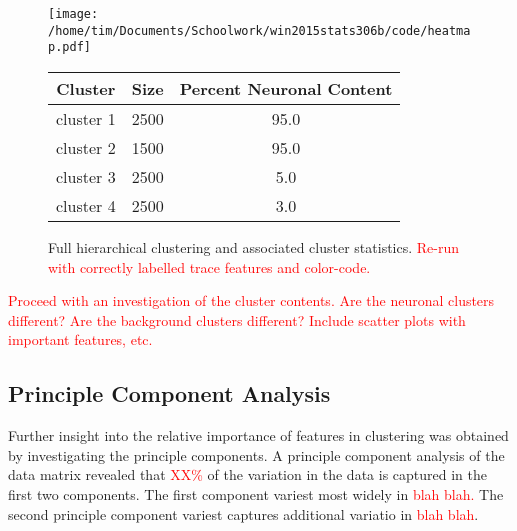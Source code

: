 \documentclass[10pt]{article}
\newcommand{\todo}[1]{\textcolor{red}{#1}}
\begin{document}
\begin{figure}[h]
    \centering

    \begin{minipage}{0.55\textwidth}
      \centering
      \texttt{[image: /home/tim/Documents/Schoolwork/win2015stats306b/code/heatmap.pdf]}
    \end{minipage}
    \begin{minipage}{0.4\textwidth}
      \centering
      \scriptsize
      \begin{tabular}{cSS}
        \toprule
        Cluster & {Size} & {Percent Neuronal Content} \\
        \midrule
        cluster 1 & 2500 & 95.0 \\
        cluster 2 & 1500 & 95.0 \\
        cluster 3 & 2500 &  5.0 \\
        cluster 4 & 2500 &  3.0 \\
        \bottomrule
      \end{tabular}
    \end{minipage}
    \caption{\footnotesize Full hierarchical clustering and associated cluster statistics. \todo{Re-run with correctly labelled trace features and color-code.}}
    \label{fig:fullhierarchical}
\end{figure}

\todo{Proceed with an investigation of the cluster contents. Are the neuronal clusters different? Are the background clusters different?}
\todo{Include scatter plots with important features, etc.}

\subsection{Principle Component Analysis}

Further insight into the relative importance of features in clustering was obtained by investigating the principle components.
A principle component analysis of the data matrix revealed that \todo{XX\%} of the variation in the data is captured in the first two components.
The first component variest most widely in \todo{blah blah.}
The second principle component variest captures additional variatio in \todo{blah blah}.
\end{document}
